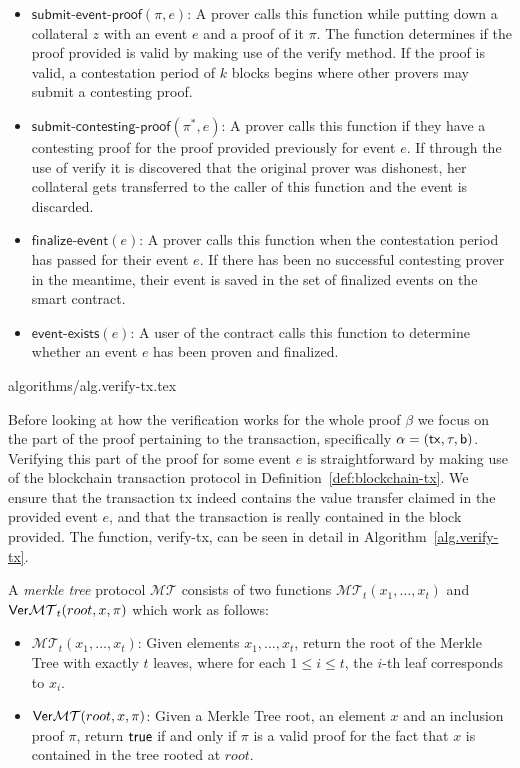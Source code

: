 \begin{itemize}
  \item $\textsf{submit-event-proof}(\pi, e)$: A prover calls this function while putting down a collateral $z$ with an event $e$ and a proof of it $\pi$. The function determines if the proof provided is valid by making use of the \textsf{verify} method. If the proof is valid, a contestation period of $k$ blocks begins where other provers may submit a contesting proof.
  \item $\textsf{submit-contesting-proof}(\pi^*, e)$: A prover calls this function if they have a contesting proof for the proof provided previously for event $e$. If through the use of \textsf{verify} it is discovered that the original prover was dishonest, her collateral gets transferred to the caller of this function and the event is discarded.
  \item $\textsf{finalize-event}(e)$: A prover calls this function when the contestation period has passed for their event $e$. If there has been no successful contesting prover in the meantime, their event is saved in the set of finalized events on the smart contract.
  \item $\textsf{event-exists}(e)$: A user of the contract calls this function to determine whether an event $e$ has been proven and finalized.
\end{itemize}

{algorithms/alg.verify-tx.tex}

Before looking at how the verification works for the whole proof $\beta$ we focus on the part of the proof pertaining to the transaction, specifically $\alpha = \sf(tx, \tau, b)$. Verifying this part of the proof for some event $e$ is straightforward by making use of the blockchain transaction protocol in Definition~\ref{def:blockchain-tx}. We ensure that the transaction \textsf{tx} indeed contains the value transfer claimed in the provided event $e$, and that the transaction is really contained in the block provided. The function, \textsf{verify-tx}, can be seen in detail in Algorithm~\ref{alg.verify-tx}.

\begin{definition}
  A \emph{merkle tree} protocol $\mathcal{MT}$ consists of two functions $\mathcal{MT}_t(x_1, \dots, x_t)$ and $\mathsf{Ver}\mathcal{MT}_t(root, x, \pi)$ which work as follows:

  \begin{itemize}
    \item $\mathcal{MT}_t(x_1, \dots, x_t)$: Given elements $x_1, \dots, x_t$, return the root of the Merkle Tree with exactly $t$ leaves, where for each $1 \le i \le t$, the $i$-th leaf corresponds to $x_i$.

    \item $\mathsf{Ver}\mathcal{MT}(root, x, \pi)$: Given a Merkle Tree root, an element $x$ and an inclusion proof $\pi$, return $\sf{true}$ if and only if $\pi$ is a valid proof for the fact that $x$ is contained in the tree rooted at $root$.
  \end{itemize}
\end{definition}

